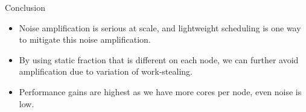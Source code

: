 \documentclass[serif,mathserif,final]{beamer}
\begin{document}
\begin{frame}{}
\begin{columns}[t]
\begin{column}{0.27\linewidth}
  \begin{block}{\small Conclusion}
    \begin{itemize}
    \item \small Noise amplification is serious at scale, and lightweight scheduling is one way to mitigate this noise amplification. 
    \item \small By using static fraction that is different on each node, we can further avoid amplification due to variation of work-stealing.
    \item \small Performance gains are highest as we have more cores per node, even noise is low. 
    \end{itemize}   
  \end{block}     
\end{column}%

\end{columns}
 
\end{frame} 
  
\end{document}
